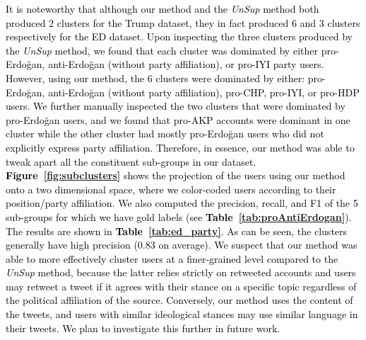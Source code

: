 \documentclass[letterpaper]{article} \usepackage{aaai20}  \usepackage{times}  \usepackage{stackengine}
\newcommand{\kareem}{\textcolor{black}}
\begin{document}
\kareem{It is noteworthy that although our method and the \textit{UnSup} method both produced 2 clusters for the Trump dataset, they in fact produced 6 and 3 clusters respectively for the ED dataset. Upon inspecting the three clusters produced by the \textit{UnSup} method, we found that each cluster was dominated by either pro-Erdo\u{g}an, anti-Erdo\u{g}an (without party affiliation), or pro-IYI party users.  However, using our method, the 6 clusters were dominated by either: pro-Erdo\u{g}an, anti-Erdo\u{g}an (without party affiliation), pro-CHP, pro-IYI, or pro-HDP users. We further manually inspected the two clusters that were dominated by pro-Erdo\u{g}an users, and we found that pro-AKP accounts were dominant in one cluster while the other cluster had mostly pro-Erdo\u{g}an users who did not explicitly express party affiliation. Therefore, in essence, our method was able to tweak apart all the constituent sub-groups in our dataset. \textbf{Figure~\ref{fig:subclusters}} shows the projection of the users using our method onto a two dimensional space, where we color-coded users according to their position/party affiliation. We also computed the precision, recall, and F1 of the 5 sub-groups for which we have gold labels (see \textbf{Table~\ref{tab:proAntiErdogan}}).  The results are shown in \textbf{Table~\ref{tab:ed_party}}.  As can be seen, the clusters generally have high precision (0.83 on average). We suspect that our method was able to more effectively cluster users at a finer-grained level compared to the \textit{UnSup} method, because the latter relies strictly on retweeted accounts and users may retweet a tweet if it agrees with their stance on a specific topic regardless of the political affiliation of the source. Conversely, our method uses the content of the tweets, and users with similar ideological stances may use similar language in their tweets.  We plan to investigate this further in future work.}
\end{document}
